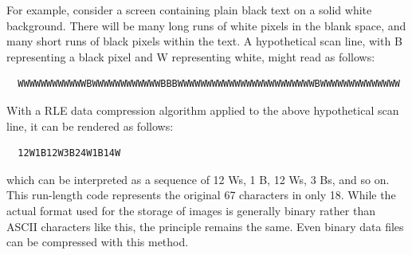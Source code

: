 \documentclass{article}
\begin{document}
  For example, consider a screen containing plain black text on a solid white background. There will be many long runs of white pixels in the blank space, and many short runs of black pixels within the text. A hypothetical scan line, with B representing a black pixel and W representing white, might read as follows: 
  \begin{lstlisting}
  WWWWWWWWWWWWBWWWWWWWWWWWWBBBWWWWWWWWWWWWWWWWWWWWWWWWBWWWWWWWWWWWWWW
  \end{lstlisting}
  With a RLE data compression algorithm applied to the above hypothetical scan line, it can be rendered as follows: 
  \begin{lstlisting}
  12W1B12W3B24W1B14W
  \end{lstlisting}
  which can be interpreted as a sequence of 12 Ws, 1 B, 12 Ws, 3 Bs, and so on. This run-length code represents the original 67 characters in only 18. While the actual format used for the storage of images is generally binary rather than ASCII characters like this, the principle remains the same. Even binary data files can be compressed with this method. 



\end{document}
